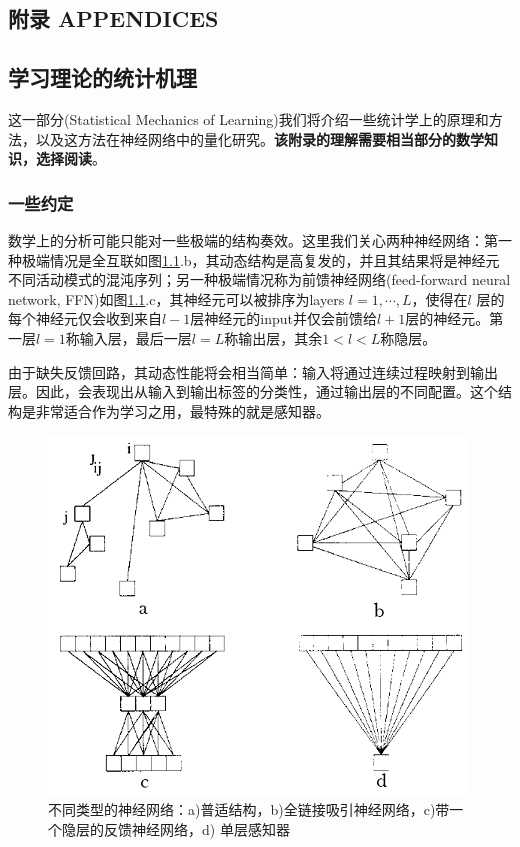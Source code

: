\documentclass[11pt,fleqn, UTF8]{ctexbook} %
\begin{document}
\begin{subappendices}
\part{附录 APPENDICES}
\chapter{学习理论的统计机理}
这一部分(Statistical Mechanics of Learning)我们将介绍一些统计学上的原理和方法，以及这方法在神经网络中的量化研究。\textbf{该附录的理解需要相当部分的数学知识，选择阅读}。

\section{一些约定}
数学上的分析可能只能对一些极端的结构奏效。这里我们关心两种神经网络：第一种极端情况是全互联如图\ref{fig:app1}.b，其动态结构是高复发的，并且其结果将是神经元不同活动模式的混沌序列；另一种极端情况称为前馈神经网络(feed-forward neural network, FFN)如图\ref{fig:app1}.c，其神经元可以被排序为layers $l=1,\cdots,L$，使得在$l$ 层的每个神经元仅会收到来自$l-1$层神经元的input并仅会前馈给$l+1$层的神经元。第一层$l=1$称输入层，最后一层$l=L$称输出层，其余$1<l<L$称隐层。

由于缺失反馈回路，其动态性能将会相当简单：输入将通过连续过程映射到输出层。因此，会表现出从输入到输出标签的分类性，通过输出层的不同配置。这个结构是非常适合作为学习之用，最特殊的就是感知器。

\begin{figure}[t]
 \centering
 \includegraphics{pics/app1.png}
 \caption{不同类型的神经网络：a)普适结构，b)全链接吸引神经网络，c)带一个隐层的反馈神经网络，d) 单层感知器}
 \label{fig:app1}
\end{figure}

\end{subappendices}
\end{document}
